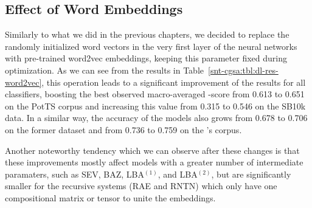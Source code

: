 
\subsection{Effect of Word Embeddings}

Similarly to what we did in the previous chapters, we decided to
replace the randomly initialized word vectors in the very first layer
of the neural networks with pre-trained word2vec embeddings, keeping
this parameter fixed during optimization.  As we can see from the
results in Table~\ref{snt-cgsa:tbl:dl-res-word2vec}, this operation
leads to a significant improvement of the results for all classifiers,
boosting the best observed macro-averaged \F-score from 0.613 to 0.651
on the PotTS corpus and increasing this value from 0.315 to 0.546 on
the SB10k data.  In a similar way, the accuracy of the models also
grows from 0.678 to 0.706 on the former dataset and from 0.736 to
0.759 on the \citeauthor{Cieliebak:17}'s corpus.

Another noteworthy tendency which we can observe after these changes
is that these improvements mostly affect models with a greater number
of intermediate paramaters, such as SEV, BAZ, LBA$^{(1)}$, and
LBA$^{(2)}$, but are significantly smaller for the recursive systems
(RAE and RNTN) which only have one compositional matrix or tensor to
unite the embeddings.

